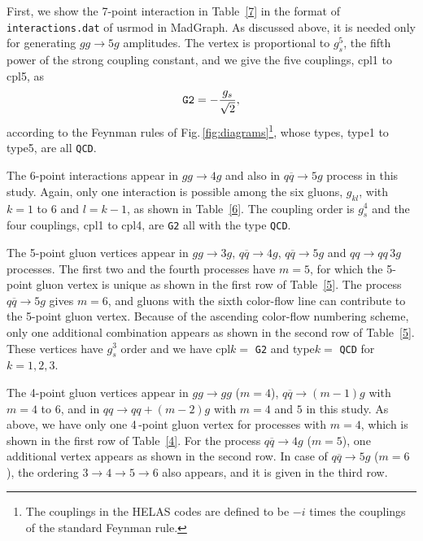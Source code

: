 First, we show the 7-point interaction in Table~\ref{7} in the format of
 {\tt
interactions.dat} of usrmod in MadGraph\cite{MG/ME}. As discussed above,
 it is needed  only for generating $gg\rightarrow 5g$ amplitudes. The vertex is
proportional to $g_s^5$, the fifth power of the strong coupling constant, and
we give the five couplings, cpl1 to cpl5, as
\begin{equation}
 {\tt G2} =-\frac{g_s}{\sqrt{2}},
\end{equation}
according to the Feynman rules of Fig.\,\ref{fig:diagrams}\footnote{The
couplings in the HELAS codes are defined to be $-i$ times the couplings
of the standard Feynman rule.}, whose
types, type1 to type5, are all {\tt QCD}.

The 6-point interactions appear in $gg\rightarrow 4g$ and also in
$q\overline{q}\rightarrow 5g$ process in this study. Again, only one
interaction is possible among the six gluons, $g_{kl}$, with $k=1$ to
$6$ and $l=k-1$, as shown in Table~\ref{6}. The coupling order is
$g_s^4$ and the four couplings, cpl1 to cpl4, are {\tt G2} all with the type
{\tt QCD}.

The 5-point gluon vertices appear in $gg\rightarrow 3g$,
$q\overline{q}\rightarrow 4g$, $q\overline{q}\rightarrow 5g$ and $qq\rightarrow
qq\,3g$ processes. The first two and the fourth processes have $m=5$, for which
the 5-point gluon vertex is unique as shown in the first row of
Table~\ref{5}. The process $q\overline{q}\rightarrow 5g$ gives $m=6$,
and gluons with the sixth color-flow line can contribute to the 5-point gluon
vertex. Because of the ascending color-flow numbering scheme, only one
additional combination appears as shown in the second row of
Table~\ref{5}. These vertices have $g_s^3$ order and we have cpl$k=$ {\tt G2}
and type$k=$ {\tt QCD} for $k=1,2,3$.

The 4-point gluon vertices appear in $gg\rightarrow gg$
($m=4$), $q\overline{q}\rightarrow (m-1)g$ with $m=4$ to $6$, and in
$qq\rightarrow qq+(m-2)g$ with $m=4$ and $5$ in this study. As above, we
have only one 4\,-point gluon vertex for processes with $m=4$, which is shown in
the first row of Table~\ref{4}. For the process $q\overline{q}\rightarrow
4g$ ($m=5$), one additional vertex appears as shown in the second
row. In case of $q\overline{q}\rightarrow 5g$ ($m=6$), the ordering
$3\rightarrow 4\rightarrow 5\rightarrow 6$ also appears, and it is given
in the third row.

